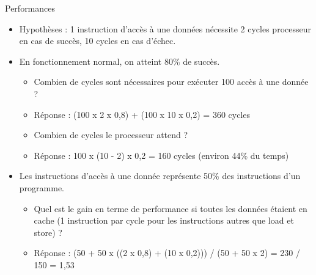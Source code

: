 %
\begin{Frame}{Performances}
      \begin{block}{}
        \begin{itemize}
        \item Hypothèses :  1 instruction d'accès à une données nécessite 2 cycles processeur en cas de succès, 10 cycles en cas d'échec.
        \item En fonctionnement normal, on atteint 80\% de succès. 
   	\begin{itemize}
		\item Combien de cycles sont nécessaires pour exécuter 100 accès à une donnée ?
		\item Réponse : (100 x 2 x 0,8) + (100 x 10 x 0,2) = 360 cycles
		\item Combien de cycles le processeur attend ?
		\item Réponse : 100 x (10 - 2) x 0,2 = 160 cycles (environ 44\% du temps)
        \end{itemize}
	\item Les instructions d'accès à une donnée représente 50\% des instructions d'un programme.  
   	\begin{itemize}
		\item Quel est le gain en terme de performance si toutes les données étaient en cache (1 instruction par cycle pour les instructions autres que load et store) ?
	\item Réponse : (50 + 50 x ((2 x 0,8) + (10 x 0,2))) / (50 + 50 x 2)  = 230 / 150 = 1,53
	\end{itemize}
        \end{itemize}
      \end{block} 
      
\end{Frame}


